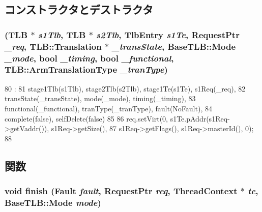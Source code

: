 \subsection{コンストラクタとデストラクタ}
\hypertarget{classArmISA_1_1Stage2LookUp_abcff27c38575e65477d6f0e57184f0a5}{
\subsubsection[{Stage2LookUp}]{ ({\bf TLB} $\ast$ {\em s1Tlb}, \/  {\bf TLB} $\ast$ {\em s2Tlb}, \/  {\bf TlbEntry} {\em s1Te}, \/  {\bf RequestPtr} {\em \_\-req}, \/  {\bf TLB::Translation} $\ast$ {\em \_\-transState}, \/  {\bf BaseTLB::Mode} {\em \_\-mode}, \/  bool {\em \_\-timing}, \/  bool {\em \_\-functional}, \/  {\bf TLB::ArmTranslationType} {\em \_\-tranType})}}
\label{classArmISA_1_1Stage2LookUp_abcff27c38575e65477d6f0e57184f0a5}



\begin{DoxyCode}
80                                                            :
81         stage1Tlb(s1Tlb), stage2Tlb(s2Tlb), stage1Te(s1Te), s1Req(_req),
82         transState(_transState), mode(_mode), timing(_timing),
83         functional(_functional), tranType(_tranType), fault(NoFault),
84         complete(false), selfDelete(false)
85     {
86         req.setVirt(0, s1Te.pAddr(s1Req->getVaddr()), s1Req->getSize(),
87                     s1Req->getFlags(), s1Req->masterId(), 0);
88     }

\end{DoxyCode}


\subsection{関数}
\hypertarget{classArmISA_1_1Stage2LookUp_a01e7d945def8d2e5df87a169954fa89f}{
\subsubsection[{finish}]{\setlength{\rightskip}{0pt plus 5cm}void finish ({\bf Fault} {\em fault}, \/  {\bf RequestPtr} {\em req}, \/  {\bf ThreadContext} $\ast$ {\em tc}, \/  {\bf BaseTLB::Mode} {\em mode})}}
\label{classArmISA_1_1Stage2LookUp_a01e7d945def8d2e5df87a169954fa89f}


